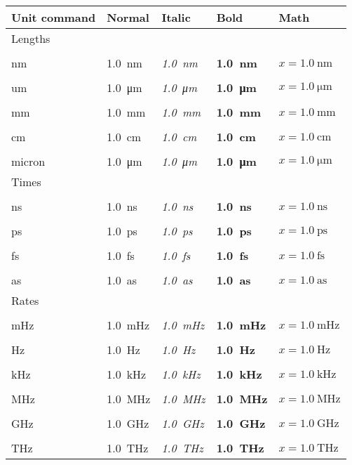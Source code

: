 \documentclass[12pt]{article}
\newcommand{\texcmd}[1]{\texttt{\char`\\#1}}
\begin{document}
\begin{table}[ht]
  \centering
  \begin{tabular}{lllll}
    \toprule
    Unit command & Normal & Italic & Bold & Math \\

    \midrule
    Lengths \\
    \texcmd{nm}     & \SI{1.0}{\nm}     & \textit{\SI{1.0}{\nm}}     & \textbf{\SI{1.0}{\nm}}     & $x = \SI{1.0}{\nm}$    \\
    \texcmd{um}     & \SI{1.0}{\um}     & \textit{\SI{1.0}{\um}}     & \textbf{\SI{1.0}{\um}}     & $x = \SI{1.0}{\um}$    \\
    \texcmd{mm}     & \SI{1.0}{\mm}     & \textit{\SI{1.0}{\mm}}     & \textbf{\SI{1.0}{\mm}}     & $x = \SI{1.0}{\mm}$    \\
    \texcmd{cm}     & \SI{1.0}{\cm}     & \textit{\SI{1.0}{\cm}}     & \textbf{\SI{1.0}{\cm}}     & $x = \SI{1.0}{\cm}$    \\
    \texcmd{micron} & \SI{1.0}{\um}     & \textit{\SI{1.0}{\um}}     & \textbf{\SI{1.0}{\um}}     & $x = \SI{1.0}{\um}$    \\

    \midrule
    Times \\
    \texcmd{ns}     & \SI{1.0}{\ns}     & \textit{\SI{1.0}{\ns}}     & \textbf{\SI{1.0}{\ns}}     & $x = \SI{1.0}{\ns}$    \\
    \texcmd{ps}     & \SI{1.0}{\ps}     & \textit{\SI{1.0}{\ps}}     & \textbf{\SI{1.0}{\ps}}     & $x = \SI{1.0}{\ps}$    \\
    \texcmd{fs}     & \SI{1.0}{\fs}     & \textit{\SI{1.0}{\fs}}     & \textbf{\SI{1.0}{\fs}}     & $x = \SI{1.0}{\fs}$    \\
    \texcmd{as}     & \SI{1.0}{\as}     & \textit{\SI{1.0}{\as}}     & \textbf{\SI{1.0}{\as}}     & $x = \SI{1.0}{\as}$    \\

    \midrule
    Rates \\
    \texcmd{mHz}    & \SI{1.0}{\mHz}    & \textit{\SI{1.0}{\mHz}}    & \textbf{\SI{1.0}{\mHz}}    & $x = \SI{1.0}{\mHz}$   \\
    \texcmd{Hz}     & \SI{1.0}{\Hz}     & \textit{\SI{1.0}{\Hz}}     & \textbf{\SI{1.0}{\Hz}}     & $x = \SI{1.0}{\Hz}$    \\
    \texcmd{kHz}    & \SI{1.0}{\kHz}    & \textit{\SI{1.0}{\kHz}}    & \textbf{\SI{1.0}{\kHz}}    & $x = \SI{1.0}{\kHz}$   \\
    \texcmd{MHz}    & \SI{1.0}{\MHz}    & \textit{\SI{1.0}{\MHz}}    & \textbf{\SI{1.0}{\MHz}}    & $x = \SI{1.0}{\MHz}$   \\
    \texcmd{GHz}    & \SI{1.0}{\GHz}    & \textit{\SI{1.0}{\GHz}}    & \textbf{\SI{1.0}{\GHz}}    & $x = \SI{1.0}{\GHz}$   \\
    \texcmd{THz}    & \SI{1.0}{\THz}    & \textit{\SI{1.0}{\THz}}    & \textbf{\SI{1.0}{\THz}}    & $x = \SI{1.0}{\THz}$   \\


\end{tabular}
\end{table}
\end{document}
